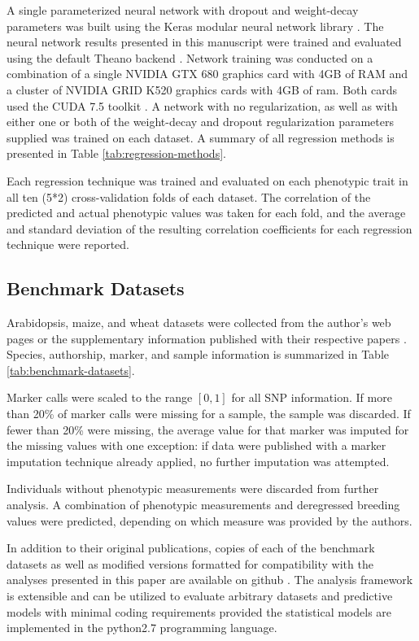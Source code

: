 A single parameterized neural network with dropout and weight-decay parameters was built using 
the Keras modular neural network library \citep{chollet2015}. The neural network results presented in this
manuscript were trained and evaluated using the default Theano backend \citep{team2016}. 
Network training was conducted on a combination of a single NVIDIA GTX 680 graphics card with 4GB 
of RAM and a cluster of NVIDIA GRID K520 graphics cards with 4GB of ram. Both cards used the 
CUDA 7.5 toolkit \citep{nickolls2008}. A network with no regularization,
as well as with either one or both of the weight-decay and dropout regularization parameters
supplied was trained on each dataset. A summary of all regression methods is presented 
in Table \ref{tab:regression-methods}.

\ifdefined\showtablesandfigures
\fi

Each regression technique was trained and evaluated on each phenotypic trait in all ten (5*2) cross-validation 
folds of each dataset. The correlation of the predicted and actual phenotypic values was taken for each fold, and the average and 
standard deviation of the resulting correlation coefficients for each regression technique were reported.

\subsection*{Benchmark Datasets}

Arabidopsis, maize, and wheat datasets were collected from the author's web pages
or the supplementary information published with their respective papers \citep{loudet2002, crossa2010, thavamanikumar2015}.
Species, authorship, marker, and sample information is summarized in Table \ref{tab:benchmark-datasets}.

\ifdefined\showtablesandfigures
\fi

Marker calls were scaled to the range $[0,1]$ for all SNP information. If more than 20\% of
marker calls were missing for a sample, the sample was discarded. If fewer than 20\% were missing,
the average value for that marker was imputed for the missing values with one exception: if data were 
published with a marker imputation technique already applied, no further imputation was attempted.

Individuals without phenotypic measurements were discarded from further analysis. A combination of phenotypic 
measurements and deregressed breeding values were predicted, depending on which measure was provided by the authors.

In addition to their original publications, copies of each of the benchmark datasets as well 
as modified versions formatted for compatibility with the analyses presented in 
this paper are available on github \citep{mcdowell2016}. The analysis framework 
is extensible and can be utilized to evaluate arbitrary datasets and predictive models
with minimal coding requirements provided the statistical models are implemented
in the python2.7 programming language.

